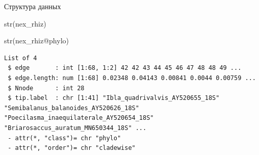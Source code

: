 \documentclass[
  ignorenonframetext,
  russian,
]{beamer}
\newenvironment{Shaded}{\begin{snugshade}}{\end{snugshade}}
\newcommand{\FunctionTok}[1]{\textcolor[rgb]{0.28,0.35,0.67}{#1}}
\newcommand{\NormalTok}[1]{\textcolor[rgb]{0.00,0.23,0.31}{#1}}
\newcommand{\SpecialCharTok}[1]{\textcolor[rgb]{0.37,0.37,0.37}{#1}}
\begin{document}
\begin{frame}[fragile]{Структура данных}
\protect{}\label{ux441ux442ux440ux443ux43aux442ux443ux440ux430-ux434ux430ux43dux43dux44bux445}
\scriptsize

\begin{Shaded}
\begin{Highlighting}[]
\FunctionTok{str}\NormalTok{(nex\_rhiz)}
\end{Highlighting}
\end{Shaded}

\begin{Shaded}
\begin{Highlighting}[]
\FunctionTok{str}\NormalTok{(nex\_rhiz}\SpecialCharTok{@}\NormalTok{phylo)}
\end{Highlighting}
\end{Shaded}

\begin{verbatim}
List of 4
 $ edge       : int [1:68, 1:2] 42 42 43 44 45 46 47 48 48 49 ...
 $ edge.length: num [1:68] 0.02348 0.04143 0.00841 0.0044 0.00759 ...
 $ Nnode      : int 28
 $ tip.label  : chr [1:41] "Ibla_quadrivalvis_AY520655_18S" "Semibalanus_balanoides_AY520626_18S" "Poecilasma_inaequilaterale_AY520654_18S" "Briarosaccus_auratum_MN650344_18S" ...
 - attr(*, "class")= chr "phylo"
 - attr(*, "order")= chr "cladewise"
\end{verbatim}
\end{frame}
\end{document}
